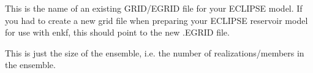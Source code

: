 \documentclass[a4paper,10pt,english]{sphinxmanual}
\begin{document}
\label{\detokenize{keywords/index:grid}}
\begin{sphinxShadowBox}

This is the name of an existing GRID/EGRID file for your ECLIPSE model. If you
had to create a new grid file when preparing your ECLIPSE reservoir model for
use with enkf, this should point to the new .EGRID file.


%
\begin{sphinxVerbatim}[commandchars=\\\{\}]
      
 
\end{sphinxVerbatim}
\end{sphinxShadowBox}
\label{\detokenize{keywords/index:num-realizations}}
\begin{sphinxShadowBox}

This is just the size of the ensemble, i.e. the number of realizations/members
in the ensemble.


%
\begin{sphinxVerbatim}[commandchars=\\\{\}]
   
 
\end{sphinxVerbatim}
\end{sphinxShadowBox}
\label{\detokenize{keywords/index:schedule-file}}
\end{document}
